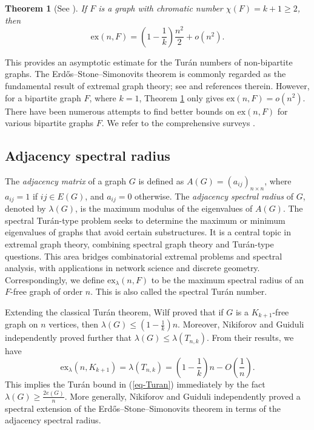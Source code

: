 \documentclass[11pt,a4paper]{article}
\theoremstyle{plain}
\newtheorem{theorem}{Theorem}[section]
\theoremstyle{definition}
\begin{document}
 \begin{theorem}[See \cite{ES1946,ES1966}] 
 \label{eq-ESS}
      If $F$ is a graph with chromatic number $\chi (F)=k+1 \ge 2$, then 
 \begin{equation*} 
  \mathrm{ex}(n,F) = \left( 1- \frac{1}{k}\right) 
  \frac{n^2}{2} + o(n^2).  
  \end{equation*}
 \end{theorem}
 This provides an asymptotic estimate for the Tur\'{a}n numbers of non-bipartite graphs. 
 The Erd\H{o}s--Stone--Simonovits theorem is commonly regarded as the fundamental result of extremal graph theory; see \cite{BE1973,BES1976,BK1994,CS1981,Ish2002} and references therein.  
 However, for a bipartite graph $F$, where $k=1$, Theorem \ref{eq-ESS} only gives  $\mathrm{ex}(n,F)=o(n^2)$. 
There have been numerous attempts to find better bounds on $\mathrm{ex}(n,F)$ for various bipartite graphs $F$. We refer to 
  the comprehensive surveys \cite{FS13,Sim13}. 


\subsection{Adjacency spectral radius} 


The {\it adjacency matrix} of a graph $G$ is defined as $A(G)=(a_{ij})_{n\times n}$, where $a_{ij}=1$ if $ij\in E(G)$, and $a_{ij}=0$ otherwise. The {\it adjacency spectral radius} of $G$, denoted by $\lambda (G)$, is the maximum modulus of the eigenvalues of $A(G)$. 
The spectral Tur\'{a}n-type problem seeks to determine the maximum or minimum eigenvalues of graphs that avoid certain substructures. 
It is a central topic in extremal graph theory, combining spectral graph theory and Tur\'{a}n-type questions. This area bridges combinatorial extremal problems and spectral analysis, with applications in network science and discrete geometry. Correspondingly, we define 
$\mathrm{ex}_{\lambda}(n,F)$ to be the maximum spectral radius of an $F$-free graph of order $n$. This is also called the spectral Tur\'{a}n number.  
 

Extending the classical Tur\'{a}n theorem, Wilf \cite{Wil1986} proved that if $G$ is a $K_{k+1}$-free graph on $n$ vertices, then $ \lambda (G) \le \left( 1- \frac{1}{k}\right)n$.  
Moreover, Nikiforov \cite{Niki2007laa2} and Guiduli \cite{Gui1996} independently proved further that 
$\lambda (G)\le \lambda (T_{n,k})$. 
From their results, we have  
\begin{equation} \label{eq-a-Turan}
 \mathrm{ex}_{\lambda}(n,K_{k+1}) = \lambda (T_{n,k})=
 \left( 1-\frac{1}{k} \right)n - 
 O(\frac{1}{n}). 
\end{equation}
This implies the Tur\'{a}n bound in (\ref{eq-Turan}) immediately by the fact $\lambda (G)\ge \frac{2e(G)}{n}$. More generally, 
Nikiforov \cite{ESB2009} and
Guiduli \cite{Gui1996} independently proved a spectral extension of the Erd\H{o}s--Stone--Simonovits theorem in terms of the adjacency spectral radius. 
\end{document}
